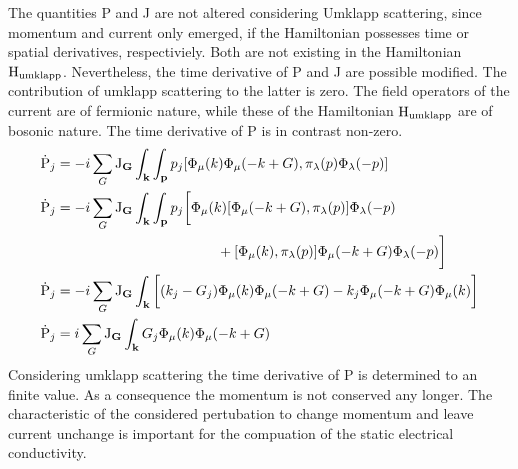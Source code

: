 The quantities P and J are not altered considering Umklapp scattering, since momentum and current only emerged, if the Hamiltonian possesses time or spatial derivatives, respectiviely.
Both are not existing in the Hamiltonian $\mathrm{H}_{\mathrm{umklapp}}$.
Nevertheless, the time derivative of P and J are possible modified.
The contribution of umklapp scattering to the latter is zero. 
The field operators of the current are of fermionic nature, while these of the Hamiltonian $\mathrm{H}_{\mathrm{umklapp}}$ are of bosonic nature.
The time derivative of P is in contrast non-zero.
%
\begin{align}
	\dot{\mt{P}}_{j} &= -i \sum\limits_{G} \mt{J}_{\vb{G}} 
		\int_{\vb{k}} \int_{\vb{p}}
		p_{j}
		\comm{\Phi_{\mu}(k) \Phi_{\mu}(-k+G)}{\pi_{\lambda}(p) \Phi_{\lambda}(-p)}
	\notag \\
	\dot{\mt{P}}_{j} &= -i \sum\limits_{G} \mt{J}_{\vb{G}} 
		\int_{\vb{k}} \int_{\vb{p}} 
		p_{j} \bigg[
			\Phi_{\mu}(k) \comm{\Phi_{\mu}(-k+G)}{\pi_{\lambda}(p)} \Phi_{\lambda}(-p)
			\notag \\ &\hspace{4.05cm}+
			\comm{\Phi_{\mu}(k)}{\pi_{\lambda}(p)} \Phi_{\mu}(-k+G) \Phi_{\lambda}(-p)
		\bigg]
	\notag \\
	\dot{\mt{P}}_{j} &= -i \sum\limits_{G} \mt{J}_{\vb{G}} 
		\int_{\vb{k}} 
		\bigg[
			(k_{j} - G_{j}) \Phi_{\mu}(k) \Phi_{\mu}(-k+G)
			-
			k_{j} \Phi_{\mu}(-k+G) \Phi_{\mu}(k)
		\bigg]
	\notag \\
	\dot{\mt{P}}_{j} &= i \sum\limits_{G} \mt{J}_{\vb{G}} 
		\int_{\vb{k}} G_{j} \Phi_{\mu}(k) \Phi_{\mu}(-k+G)
	\label{appeq:time derivative momentum}
\end{align}
%
Considering umklapp scattering the time derivative of P is determined to an finite value.
As a consequence the momentum is not conserved any longer.
The characteristic of the considered pertubation to change momentum and leave current unchange is important for the compuation of the static electrical conductivity.












